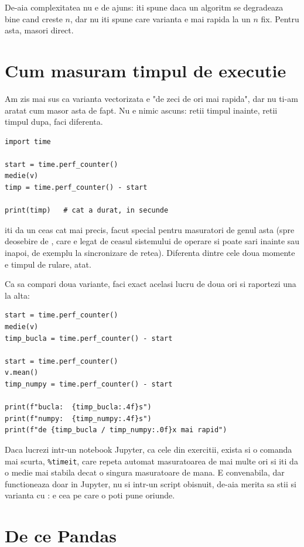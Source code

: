 De-aia complexitatea nu e de ajuns: iti spune daca un algoritm se
degradeaza bine cand creste $n$, dar nu iti spune care varianta e mai
rapida la un $n$ fix. Pentru asta, masori direct.

\section{Cum masuram timpul de executie}

Am zis mai sus ca varianta vectorizata e "de zeci de ori mai rapida", dar
nu ti-am aratat cum masor asta de fapt. Nu e nimic ascuns: retii timpul
inainte, retii timpul dupa, faci diferenta.

\begin{verbatim}
import time

start = time.perf_counter()
medie(v)
timp = time.perf_counter() - start

print(timp)   # cat a durat, in secunde
\end{verbatim}

 iti da un ceas cat mai precis, facut special
pentru masuratori de genul asta (spre deosebire de ,
care e legat de ceasul sistemului de operare si poate sari inainte sau
inapoi, de exemplu la sincronizare de retea). Diferenta dintre cele doua
momente e timpul de rulare, atat.

Ca sa compari doua variante, faci exact acelasi lucru de doua ori si
raportezi una la alta:

\begin{verbatim}
start = time.perf_counter()
medie(v)
timp_bucla = time.perf_counter() - start

start = time.perf_counter()
v.mean()
timp_numpy = time.perf_counter() - start

print(f"bucla:  {timp_bucla:.4f}s")
print(f"numpy:  {timp_numpy:.4f}s")
print(f"de {timp_bucla / timp_numpy:.0f}x mai rapid")
\end{verbatim}

Daca lucrezi intr-un notebook Jupyter, ca cele din exercitii, exista si o
comanda mai scurta, \texttt{\%timeit}, care repeta automat masuratoarea de
mai multe ori si iti da o medie mai stabila decat o singura masuratoare
de mana. E convenabila, dar functioneaza doar in Jupyter, nu si intr-un
script  obisnuit, de-aia merita sa stii si varianta cu
: e cea pe care o poti pune oriunde.

\section{De ce Pandas}

